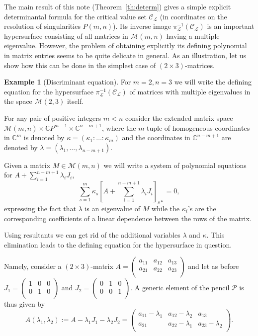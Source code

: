 \documentclass[10pt,twoside,a4paper,reqno]{amsart}
\theoremstyle{plain}
\theoremstyle{definition}
\newtheorem{exam+}           {Example}
\theoremstyle{remark}
\newenvironment{example}{\begin{exam+}}{\end{exam+}}
\begin{document}
The main result of this note (Theorem~\ref{th:determ}) gives a simple explicit determinantal formula for the critical value set ${\mathcal C}_{\mathcal L}$ (in coordinates on the resolution of singularities $P(m,n)$). Its inverse image $\pi_{\mathcal L}^{-1}({\mathcal C}_{\mathcal L})$ is an important hypersurface  consisting of all matrices in ${\mathcal {M}}(m,n)$ having a multiple eigenvalue. However, the problem of obtaining explicitly its defining polynomial in matrix entries seems to be quite delicate in general. As an illustration, let us show how this can be done in the simplest case of $(2\times 3)$-matrices.    

\begin{example}[Discriminant equation]
For $m=2, n=3$ we will write the
defining  equation for the hypersurface $\pi_{\mathcal L}^{-1}({\mathcal C}_{\mathcal L})$  of matrices with multiple
eigenvalues in the space ${\mathcal {M}}(2,3)$ itself.

For any pair of positive integers $m<n$ consider the extended matrix space ${\mathcal {M}}(m,n)\times {\mathbb {C}}
P^{m-1}\times {\mathbb {C}}^{n-m+1}$,
 where the $m$-tuple of homogeneous coordinates in ${\mathbb {C}}^m$ is denoted by
$\kappa=(\kappa_1:\dots:\kappa_m)$ and the coordinates  in
${\mathbb {C}}^{n-m+1}$ are denoted by
$\lambda=(\lambda_1,\dots,\lambda_{n-m+1})$.

Given a matrix $M\in {\mathcal {M}}(m,n)$ we will write a system of polynomial
equations for 
$A+\sum_{i=1}^{n-m+1}\lambda_i J_i$, 
\[\sum_{s=1}^m \kappa_s [A+\sum_{i=1}^{n-m+1}\lambda_i
J_i]_{s*}=0,\]
expressing the fact that $\lambda$ is an eigenvalue of
$M$ while the $\kappa_i$'s are the corresponding coefficients of a
linear dependence between the rows of the matrix.

Using resultants we can  get rid of the additional variables $\lambda$ and
$\kappa$. This elimination  leads to the defining equation for the hypersurface in question.

Namely,  consider a $(2\times 3)$-matrix
$A=\left(\begin{array}{ccc}
  a_{11} & a_{12} & a_{13} \\
  a_{21} & a_{22} & a_{23} \\
\end{array}\right)$ and let as before 
$J_1=\left(\begin{array}{ccc}
  1 & 0 & 0 \\
  0 & 1 & 0 \\
\end{array}\right)$
and $J_2=\left(\begin{array}{ccc}
  0 & 1 & 0 \\
  0 & 0 & 1 \\
\end{array}\right)$.
A generic element of the pencil ${\mathcal P}$ is thus given by 
$$A(\lambda_1,\lambda_2):=A-\lambda_1 J_1-\lambda_2 J_2=\left(\begin{array}{ccc}
  a_{11}-\lambda_1 & a_{12}-\lambda_2 & a_{13} \\
  a_{21} & a_{22}-\lambda_1 & a_{23}-\lambda_2 \\
\end{array}\right).$$


\end{example}
\end{document}
